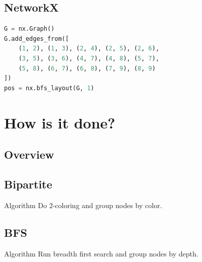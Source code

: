 \documentclass[11pt]{beamer}
\begin{document}
\subsection{NetworkX}
\begin{frame}{\subsecname}
\begin{figure}
\resizebox{0.8\textwidth}{!}{}
\end{figure}
\end{frame}

\begin{frame}[fragile]{\subsecname}
    \begin{block}{}
        \begin{lstlisting}[language=python]
G = nx.Graph()
G.add_edges_from([
    (1, 2), (1, 3), (2, 4), (2, 5), (2, 6),
    (3, 5), (3, 6), (4, 7), (4, 8), (5, 7),
    (5, 8), (6, 7), (6, 8), (7, 9), (8, 9)
])
pos = nx.bfs_layout(G, 1)
        \end{lstlisting}
    \end{block}
\end{frame}

\section{How is it done?}

\subsection{Overview}
\begin{frame}{\subsecname}
\end{frame}

\subsection{Bipartite}
\begin{frame}{\subsecname}

    \begin{block}{Algorithm}
        Do 2-coloring and group nodes by color.
    \end{block}

    \pause
    \resizebox{0.8\textwidth}{!}{}
\end{frame}

\subsection{BFS}
\begin{frame}{\subsecname}

    \begin{block}{Algorithm}
        Run breadth first search and group nodes by depth.\\
    \end{block}

    \pause
    \resizebox{0.8\textwidth}{!}{}

\end{frame}
\end{document}
